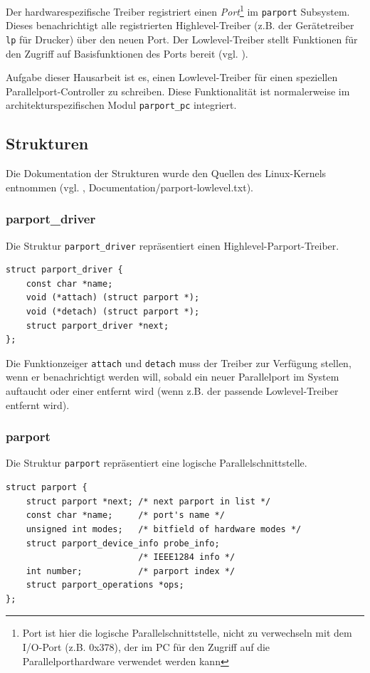 \documentclass[a4paper,11pt]{article}
\begin{document}
Der hardwarespezifische Treiber registriert einen \emph{Port}\footnote{Port ist hier die logische Parallelschnittstelle, nicht zu verwechseln
mit dem I/O-Port (z.B. 0x378), der im PC für den Zugriff auf die Parallelporthardware verwendet werden kann} 
im \verb|parport| Subsystem. 
Dieses benachrichtigt alle registrierten Highlevel-Treiber (z.B. der Gerätetreiber \verb|lp| für Drucker) über den neuen Port. Der Lowlevel-Treiber stellt
Funktionen für den Zugriff auf Basisfunktionen des Ports bereit (vgl. \cite{net:1}).

Aufgabe dieser Hausarbeit ist es, einen Lowlevel-Treiber für einen speziellen Parallelport-Controller zu schreiben. Diese 
Funktionalität ist normalerweise im architekturspezifischen Modul \verb|parport_pc| integriert.

\subsection{Strukturen}

Die Dokumentation der Strukturen wurde den Quellen des Linux-Kernels entnommen 
(vgl. \cite{net:2}, Documentation/parport-lowlevel.txt).

\subsubsection{parport\_driver}

Die Struktur \verb|parport_driver| repräsentiert einen Highlevel-Parport-Treiber.

\begin{verbatim}
struct parport_driver {
    const char *name;
    void (*attach) (struct parport *);
    void (*detach) (struct parport *);
    struct parport_driver *next;
};\end{verbatim}

Die Funktionzeiger \verb|attach| und \verb|detach| muss der Treiber zur Verfügung stellen, wenn er benachrichtigt
werden will, sobald ein neuer Parallelport im System auftaucht oder einer entfernt wird (wenn z.B. der
passende Lowlevel-Treiber entfernt wird).

\subsubsection{parport}

Die Struktur \verb|parport| repräsentiert eine logische Parallelschnittstelle.

\begin{verbatim}
struct parport {
    struct parport *next; /* next parport in list */
    const char *name;     /* port's name */
    unsigned int modes;   /* bitfield of hardware modes */
    struct parport_device_info probe_info;
                          /* IEEE1284 info */
    int number;           /* parport index */
    struct parport_operations *ops;
};\end{verbatim}
\end{document}
